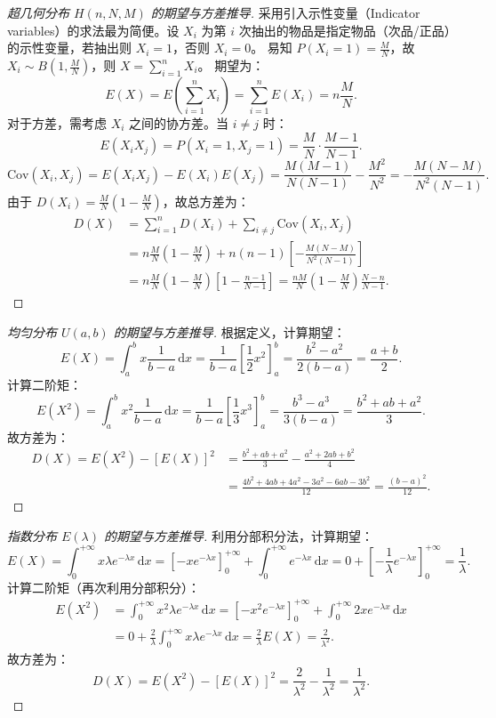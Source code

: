 ﻿\documentclass[lang=cn,11pt]{elegantbook}
\begin{document}
\begin{proof}[超几何分布 $H(n,N,M)$ 的期望与方差推导]
采用引入示性变量（Indicator variables）的求法最为简便。设 $X_i$ 为第 $i$ 次抽出的物品是指定物品（次品/正品）的示性变量，若抽出则 $X_i=1$，否则 $X_i=0$。
易知 $P(X_i=1) = \frac{M}{N}$，故 $X_i \sim B(1, \frac{M}{N})$，则 $X = \sum_{i=1}^n X_i$。
期望为：
\[
E(X) = E\left(\sum_{i=1}^n X_i\right) = \sum_{i=1}^n E(X_i) = n \frac{M}{N}.
\]
对于方差，需考虑 $X_i$ 之间的协方差。当 $i \neq j$ 时：
\[
E(X_i X_j) = P(X_i=1, X_j=1) = \frac{M}{N} \cdot \frac{M-1}{N-1}.
\]
\[
\mathrm{Cov}(X_i, X_j) = E(X_i X_j) - E(X_i)E(X_j) = \frac{M(M-1)}{N(N-1)} - \frac{M^2}{N^2} = -\frac{M(N-M)}{N^2(N-1)}.
\]
由于 $D(X_i) = \frac{M}{N}\left(1-\frac{M}{N}\right)$，故总方差为：
\[
\begin{aligned}
D(X) &= \sum_{i=1}^n D(X_i) + \sum_{i \neq j} \mathrm{Cov}(X_i, X_j) \\
&= n \frac{M}{N}\left(1-\frac{M}{N}\right) + n(n-1)\left[-\frac{M(N-M)}{N^2(N-1)}\right] \\
&= n \frac{M}{N}\left(1-\frac{M}{N}\right) \left[1 - \frac{n-1}{N-1}\right] = \frac{nM}{N}\left(1-\frac{M}{N}\right)\frac{N-n}{N-1}.
\end{aligned}
\]
\end{proof}

\begin{proof}[均匀分布 $U(a,b)$ 的期望与方差推导]
根据定义，计算期望：
\[
E(X) = \int_{a}^{b} x \frac{1}{b-a} \,\mathrm{d}x = \frac{1}{b-a} \left[ \frac{1}{2}x^2 \right]_{a}^{b} = \frac{b^2-a^2}{2(b-a)} = \frac{a+b}{2}.
\]
计算二阶矩：
\[
E(X^2) = \int_{a}^{b} x^2 \frac{1}{b-a} \,\mathrm{d}x = \frac{1}{b-a} \left[ \frac{1}{3}x^3 \right]_{a}^{b} = \frac{b^3-a^3}{3(b-a)} = \frac{b^2+ab+a^2}{3}.
\]
故方差为：
\[
\begin{aligned}
D(X) = E(X^2) - [E(X)]^2 &= \frac{b^2+ab+a^2}{3} - \frac{a^2+2ab+b^2}{4} \\
&= \frac{4b^2+4ab+4a^2-3a^2-6ab-3b^2}{12} = \frac{(b-a)^2}{12}.
\end{aligned}
\]
\end{proof}

\begin{proof}[指数分布 $E(\lambda)$ 的期望与方差推导]
利用分部积分法，计算期望：
\[
E(X) = \int_{0}^{+\infty} x \lambda e^{-\lambda x} \,\mathrm{d}x = \left[ -x e^{-\lambda x} \right]_{0}^{+\infty} + \int_{0}^{+\infty} e^{-\lambda x} \,\mathrm{d}x = 0 + \left[ -\frac{1}{\lambda} e^{-\lambda x} \right]_{0}^{+\infty} = \frac{1}{\lambda}.
\]
计算二阶矩（再次利用分部积分）：
\[
\begin{aligned}
E(X^2) &= \int_{0}^{+\infty} x^2 \lambda e^{-\lambda x} \,\mathrm{d}x = \left[ -x^2 e^{-\lambda x} \right]_{0}^{+\infty} + \int_{0}^{+\infty} 2x e^{-\lambda x} \,\mathrm{d}x \\
&= 0 + \frac{2}{\lambda} \int_{0}^{+\infty} x \lambda e^{-\lambda x} \,\mathrm{d}x = \frac{2}{\lambda} E(X) = \frac{2}{\lambda^2}.
\end{aligned}
\]
故方差为：
\[
D(X) = E(X^2) - [E(X)]^2 = \frac{2}{\lambda^2} - \frac{1}{\lambda^2} = \frac{1}{\lambda^2}.
\]
\end{proof}
\end{document}
